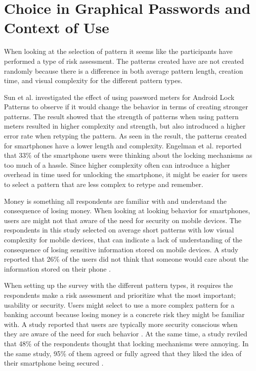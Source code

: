   \section{Choice in Graphical Passwords and Context of Use}
    
    When looking at the selection of pattern it seems like the participants have performed a type of risk assessment. The patterns created have are not created randomly because there is a difference in both average pattern length, creation time, and visual complexity for the different pattern types.

    Sun et al. \cite{Sun} investigated the effect of using password meters for Android Lock Patterns to observe if it would change the behavior in terms of creating stronger patterns. The result showed that the strength of patterns when using pattern meters resulted in higher complexity and strength, but also introduced a higher error rate when retyping the pattern. As seen in the result, the patterns created for smartphones have a lower length and complexity. Engelman et al. \cite{Egelman} reported that 33\% of the smartphone users were thinking about the locking mechanisms as too much of a hassle. Since higher complexity often can introduce a higher overhead in time used for unlocking the smartphone, it might be easier for users to select a pattern that are less complex to retype and remember.   

    Money is something all respondents are familiar with and understand the consequence of losing money. When looking at looking behavior for smartphones, users are might not that aware of the need for security on mobile devices. The respondents in this study selected on average short patterns with low visual complexity for mobile devices, that can indicate a lack of understanding of the consequence of losing sensitive information stored on mobile devices. A study reported that 26\% of the users did not think that someone would care about the information stored on their phone \cite{Egelman}. 

    When setting up the survey with the different pattern types, it requires the respondents make a risk assessment and prioritize what the most important; usability or security. Users might select to use a more complex pattern for a banking account because losing money is a concrete risk they might be familiar with. A study reported that users are typically more security conscious when they are aware of the need for such behavior \cite{Sasse}. At the same time, a study reviled that 48\% of the respondents thought that locking mechanisms were annoying. In the same study, 95\% of them agreed or fully agreed that they liked the idea of their smartphone being secured \cite{habits3}. 

